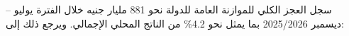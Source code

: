 سجل العجز الكلي للموازنة العامة للدولة نحو 881 مليار جنيه خلال الفترة يوليو -- ديسمبر 2025/2026 بما يمثل نحو 4.2\% من الناتج المحلي الإجمالي. ويرجع ذلك إلى:
